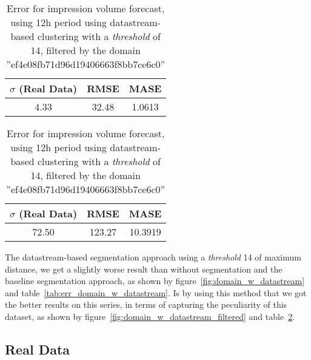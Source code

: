 \begin{table}[!ht]
\centering
\footnotesize
\begin{minipage}[t]{0.45\linewidth}
\centering
\footnotesize
\begin{tabular}{ccc}
 $\sigma$ (Real Data) & RMSE & MASE   \\ \hline
4.33 & 32.48 & 1.0613 \\
\end{tabular}

\vspace{0.5cm}

\caption[Error Volume
impression forecast, datastream, filtered]{Error for impression volume
forecast, using 12h period using datastream-based clustering with a
\emph{threshold} of 14}
\label{tab:err_domain_w_datastream}


\end{minipage}
\quad
\begin{minipage}[t]{0.45\linewidth}
\centering
\footnotesize
\begin{tabular}{ccc}
 $\sigma$ (Real Data) & RMSE & MASE   \\ \hline
72.50 & 123.27 & 10.3919 \\
\end{tabular}

\vspace{0.5cm}

\caption[Error Volume
impression forecast, domain, filtered]{Error for impression volume
forecast, using 12h period using datastream-based clustering with a
\emph{threshold} of 14, filtered by the domain ''ef4e08fb71d96d19406663f8bb7ce6c0'' }
\label{tab:err_domain_w_segmentation_datastream_filtered}


\end{minipage}

\end{table}

The datastream-based segmentation approach using a \emph{threshold} 14 of
maximum distance, we get a slightly worse result than without segmentation and
the baseline segmentation approach, as shown by
figure~\ref{fig:domain_w_datastream} and
table~\ref{tab:err_domain_w_datastream}. Is by using this method that we got the
better results on this series, in terms of capturing the peculiarity of this
dataset, as shown by figure~\ref{fig:domain_w_datastream_filtered} and
table~\ref{tab:err_domain_w_segmentation_datastream_filtered}.

\subsection{Real Data}


